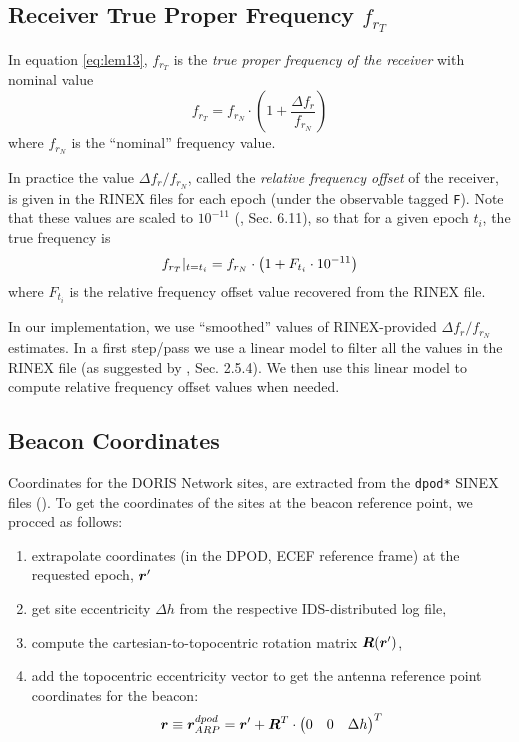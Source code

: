 \subsection{Receiver True Proper Frequency $f_{r_T}$}
\label{ssec:receiver-true-proper-frequency}
In equation \ref{eq:lem13}, $f_{r_T}$ is the \emph{true proper frequency of 
the receiver} with nominal value 
\begin{equation}
  f_{r_T} = f_{r_N} \cdot \left( 1 + \frac{\Delta f_r}{f_{r_N}} \right)
\end{equation}
where $f_{r_N}$ is the ``nominal'' frequency value.

In practice the value $\Delta f_r / f_{r_N}$, called the \emph{relative 
frequency offset} of the receiver, is given in the RINEX files for each epoch 
(under the observable tagged \texttt{F}). Note that these values are scaled to 
$10^{-11}$ (\cite{DORISRNX3}, Sec. 6.11), so that for a given epoch $t_i$, the 
true frequency is
\begin{equation}
  f_{r_T}|_{t=t_i} = f_{r_N} \cdot \left( 1 + F_{t_i} \cdot 10^{-11} \right)
  \label{eq:tpf-rec}
\end{equation}
where $F_{t_i}$ is the relative frequency offset value recovered from the RINEX 
file.

In our implementation, we use ``smoothed'' values of RINEX-provided 
$\Delta f_r / f_{r_N}$ estimates. In a first step/pass we use a linear model 
to filter all the values in the RINEX file (as suggested by \cite{lemoine-2016}, 
Sec. 2.5.4). We then use this linear model to compute relative frequency offset 
values when needed. 

\subsection{Beacon Coordinates}
\label{ssec:beacon_coordinates}
Coordinates for the DORIS Network sites, are extracted from the \texttt{dpod*} 
SINEX files (\cite{Moreaux2020}). To get the coordinates of the sites at the 
beacon reference point, we procced as follows:
\begin{enumerate}
  \item extrapolate coordinates (in the DPOD, ECEF reference frame) at the 
    requested epoch, $\bm{r}\sp{\prime}$
  \item get site eccentricity $\Delta h$ from the respective IDS-distributed 
    log file,
  \item compute the cartesian-to-topocentric rotation matrix $\bm{R}(\bm{r}\sp{\prime})$,
  \item add the topocentric eccentricity vector to get the antenna reference
    point coordinates for the beacon:
    \begin{equation}
      \bm{r} \equiv \bm{r}^{dpod}_{ARP} = 
        \bm{r}\sp{\prime} + \bm{R}^T \cdot 
          \begin{pmatrix} 0 & 0 & \Delta h \end{pmatrix}^T
      \label{eq:rg-to-rarp}
    \end{equation}
\end{enumerate}

